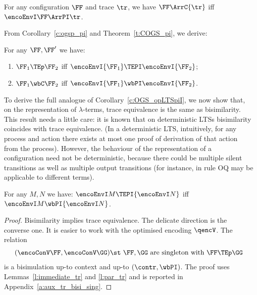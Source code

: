 



\begin{corollary} %
\label{c:ogsp_pi}
For any  \COGS configuration $\FF$ 
 and trace $\tr$,  
we have  $\FF \ArrC{\tr}$ iff $\encoEnvI \FF \ArrPI \tr $.
\end{corollary} 

\noindent
From Corollary~\ref{c:ogsp_pi} 
and Theorem~\ref{t:COGS_pi}, we derive:

\begin{lemma} %
\label{l:ogsp_pi_traces_bis}
For any $\FF,\FF'$ we have:
\begin{enumerate}
\item
 $\FF_1 \TEp \FF_2$ iff 
 $\encoEnvI {\FF_1} \TEPI \encoEnvI {\FF_2}$;  
\item
 $\FF_1 \wbC \FF_2$ iff 
 $\encoEnvI {\FF_1} \wbPI  \encoEnvI {\FF_2}$.  
\end{enumerate} 
\end{lemma} 

\noindent
To derive the full analogue of Corollary~\ref{c:OGS_opLTSpiI},  
we now show that, on the \piI representation of $\lambda$-terms,
trace equivalence is the same as bisimilarity.
This result needs a little care:
it is known that on deterministic LTSs
bisimilarity coincides with trace equivalence.
\iflong
  (In a deterministic
 LTS, intuitively,  for any process and action there exists at most
 one proof of derivation of that action from the process).
\fi
However,
 the behaviour of the \piI representation of a  \COGS
 configuration
 need not be
deterministic, because there could be
multiple silent transitions as well as multiple output transitions 
(for instance, in \COGS
rule OQ may be
applicable to different terms).

\iflong
{} 
\fi

\begin{lemma}
\label{l:tr_bisi_sing}
For any $M,N$ we have: $
{\encoEnvI M} \TEPI {\encoEnvI N}
$ iff 
${\encoEnvI M} \wbPI {\encoEnvI N}$.
\end{lemma} 

\begin{proof}
Bisimilarity implies trace equivalence. 
 The delicate direction is the converse one.
It is easier to work with the optimised encoding  $\qencV$.
The relation 
\[ 
(\encoConV \FF,  \encoConV \GG) \st \mbox{ $\FF,\GG$ are singleton with $\FF \TEp
\GG$}
\]
is a bisimulation up-to context and up-to $(\contr,
 \wbPI)$. 
The proof uses
Lemmas~\ref{l:immediate_tr} and \ref{l:par_tr}
and is reported in
Appendix~\ref{a:aux_tr_bisi_sing}.
\end{proof}

